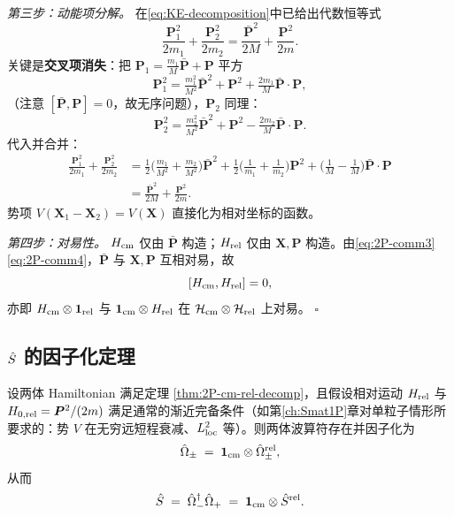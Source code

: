 \begin{proof*}
\textit{第三步：动能项分解。} 在\eqref{eq:KE-decomposition}中已给出代数恒等式
\[
  \frac{\bm{P}_1^2}{2m_1}+\frac{\bm{P}_2^2}{2m_2}=\frac{\bar{\bm{P}}^2}{2M}+\frac{\bm{P}^2}{2m}.
\]
关键是\textbf{交叉项消失}：把 $\bm{P}_1=\frac{m_1}{M}\bar{\bm{P}}+\bm{P}$ 平方
\[
  \bm{P}_1^2 = \tfrac{m_1^2}{M^2}\bar{\bm{P}}^2 + \bm{P}^2 + \tfrac{2 m_1}{M}\bar{\bm{P}}\!\cdot\!\bm{P},
\]
（注意 $[\bar{\bm{P}},\bm{P}]=0$，故无序问题），$\bm{P}_2$ 同理：
\[
  \bm{P}_2^2 = \tfrac{m_2^2}{M^2}\bar{\bm{P}}^2 + \bm{P}^2 - \tfrac{2 m_2}{M}\bar{\bm{P}}\!\cdot\!\bm{P}.
\]
代入并合并：
\begin{align*}
  \frac{\bm{P}_1^2}{2m_1}+\frac{\bm{P}_2^2}{2m_2}
  &= \frac{1}{2}\Big(\tfrac{m_1}{M^2}+\tfrac{m_2}{M^2}\Big)\bar{\bm{P}}^2
    + \frac{1}{2}\Big(\tfrac{1}{m_1}+\tfrac{1}{m_2}\Big)\bm{P}^2
    + \Big(\tfrac{1}{M}-\tfrac{1}{M}\Big)\bar{\bm{P}}\!\cdot\!\bm{P} \\
  &= \frac{\bar{\bm{P}}^2}{2M}+\frac{\bm{P}^2}{2m}.
\end{align*}
势项 $V(\bm{X}_1-\bm{X}_2)=V(\bm{X})$ 直接化为相对坐标的函数。

\textit{第四步：对易性。} $H_{\rm cm}$ 仅由 $\bar{\bm{P}}$ 构造；$H_{\rm rel}$ 仅由 $\bm{X},\bm{P}$ 构造。由\eqref{eq:2P-comm3}\eqref{eq:2P-comm4}，$\bar{\bm{P}}$ 与 $\bm{X},\bm{P}$ 互相对易，故
\[
  [H_{\rm cm},H_{\rm rel}]=0,
\]
亦即 $H_{\rm cm}\otimes\mathbf{1}_{\rm rel}$ 与 $\mathbf{1}_{\rm cm}\otimes H_{\rm rel}$ 在 $\mathcal{H}_{\rm cm}\otimes\mathcal{H}_{\rm rel}$ 上对易。 $\square$
\end{proof*}

\subsection{$\hat{S}$ 的因子化定理}

\begin{theorem}\label{thm:2P-S-factorization}
  设两体 Hamiltonian 满足定理 \ref{thm:2P-cm-rel-decomp}，且假设相对运动 $H_{\rm rel}$ 与 $H_{0,\rm rel}=\bm{P}^2/(2m)$ 满足通常的渐近完备条件（如第\ref{ch:Smat1P}章对单粒子情形所要求的：势 $V$ 在无穷远短程衰减、$L^2_{\rm loc}$ 等）。则两体波算符存在并因子化为
  \begin{equation}
    \hat{\Omega}_{\pm} \;=\; \mathbf{1}_{\rm cm}\otimes\hat{\Omega}_{\pm}^{\rm rel},
    \label{eq:2P-Omega-fact-thm}
  \end{equation}
  从而
  \begin{equation}
    \hat{S} \;=\; \hat{\Omega}_{-}^{\dagger}\hat{\Omega}_{+}
        \;=\; \mathbf{1}_{\rm cm}\otimes \hat{S}^{\rm rel}.
    \label{eq:2P-S-fact-thm}
  \end{equation}
\end{theorem}

